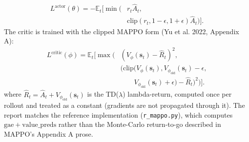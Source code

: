 \documentclass[conference]{IEEEtran}
\begin{document}
\begin{equation}
\begin{aligned}
L^{\mathrm{actor}}(\theta)=-\mathbb E_t\big[\min(&r_t\widehat A_t,\\
&\mathrm{clip}(r_t,1-\epsilon,1+\epsilon)\widehat A_t)\big].
\end{aligned}
\label{eq:actorloss}
\end{equation}
The critic is trained with the clipped MAPPO form (Yu et al. 2022, Appendix A):
\begin{equation}
\begin{aligned}
L^{\mathrm{critic}}(\phi)=\mathbb E_t\Big[\max\big(&
(V_\phi(\mathbf s_t)-\widehat R_t)^2,\;\\[-1mm]
&(\mathrm{clip}(V_\phi(\mathbf s_t),
V_{\phi_{\mathrm{old}}}(\mathbf s_t)-\epsilon,\\[-1mm]
&\qquad V_{\phi_{\mathrm{old}}}(\mathbf s_t)+\epsilon)
-\widehat R_t)^2\big)\Big].
\end{aligned}
\label{eq:criticloss}
\end{equation}
where $\widehat R_t=\widehat A_t+V_{\phi_{\mathrm{old}}}(\mathbf s_t)$ is the TD($\lambda$) lambda-return, computed once per rollout and treated as a constant (gradients are not propagated through it). The report matches the reference implementation (\texttt{r\_mappo.py}), which computes $\mathrm{gae}+\mathrm{value\_preds}$ rather than the Monte-Carlo return-to-go described in MAPPO's Appendix A prose.
\end{document}
